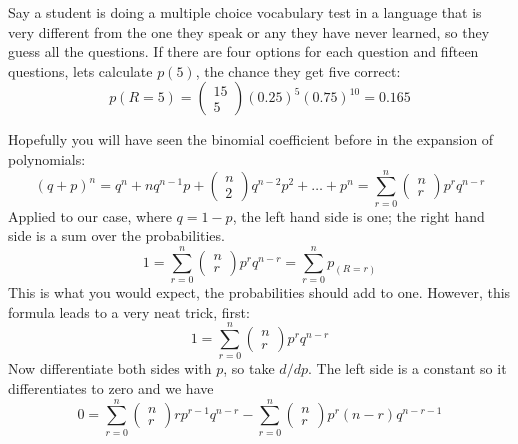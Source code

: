 \documentclass[11pt,a4paper]{scrartcl}
\begin{document}
Say a student is doing a multiple choice vocabulary test in a language
that is very different from the one they speak or any they have never
learned, so they guess all the questions. If there are four options
for each question and fifteen questions, lets calculate $p(5)$, the
chance they get five correct:
\begin{equation}
p(R=5)=\left(\begin{array}{c}15\\5\end{array}\right)(0.25)^5(0.75)^{10}=0.165
\end{equation}

Hopefully you will have seen the binomial coefficient before in the
expansion of polynomials:
\begin{equation}
(q+p)^n=q^n+nq^{n-1}p+\left(\begin{array}{c}n\\2\end{array}\right)q^{n-2}p^2+\ldots+p^n=\sum_{r=0}^n \left(\begin{array}{c}n\\r\end{array}\right)p^rq^{n-r}
\end{equation}
Applied to our case, where $q=1-p$, the left hand side is one; the right hand side is a sum over the probabilities.
\begin{equation}
1=\sum_{r=0}^n \left(\begin{array}{c}n\\r\end{array}\right)p^rq^{n-r}=\sum_{r=0}^np_(R=r)
\end{equation}
This is what you would expect, the probabilities should add to
one. However, this formula leads to a very neat trick, first:
\begin{equation}
1=\sum_{r=0}^n \left(\begin{array}{c}n\\r\end{array}\right)p^rq^{n-r}
\end{equation}
Now differentiate both sides with $p$, so take $d/dp$. The left side is a constant so it differentiates to zero and we have
\begin{equation}
0=\sum_{r=0}^n
\left(\begin{array}{c}n\\r\end{array}\right)rp^{r-1}q^{n-r}-\sum_{r=0}^n
  \left(\begin{array}{c}n\\r\end{array}\right)p^r(n-r)q^{n-r-1}
\end{equation}
\end{document}
